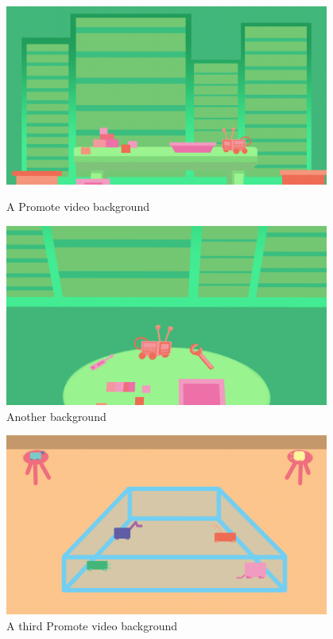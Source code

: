 \begin{figure}[ht]
\centering
\begin{minipage}[b]{.48\textwidth}
  \centering
  \includegraphics[width=0.95\textwidth]{Meetings/January/01-18-22/1.18.22_ - Falon Jones.png}
  \caption{A Promote video background}
  \label{fig:010822_1}
\end{minipage}%
\hfill%
\begin{minipage}[b]{.48\textwidth}
  \centering
  \includegraphics[width=0.95\textwidth]{Meetings/January/01-18-22/1.18.22 - Falon Jones.png}
  \caption{Another background}
  \label{fig:010822_2}
\end{minipage}
\end{figure}

\begin{figure}[htp]
\centering
\includegraphics[width=0.95\textwidth, angle=0]{Meetings/January/01-18-22/1.18.22- - Falon Jones.png}
\caption{A third Promote video background}
\label{fig:010822_3}
\end{figure}



